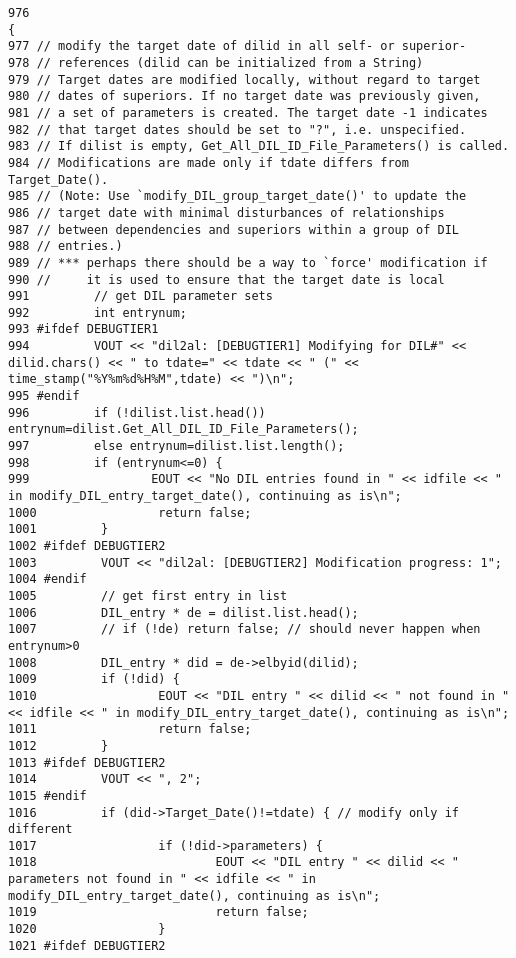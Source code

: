 \footnotesize\begin{verbatim}976                                                                                             {
977 // modify the target date of dilid in all self- or superior-
978 // references (dilid can be initialized from a String)
979 // Target dates are modified locally, without regard to target
980 // dates of superiors. If no target date was previously given,
981 // a set of parameters is created. The target date -1 indicates
982 // that target dates should be set to "?", i.e. unspecified.
983 // If dilist is empty, Get_All_DIL_ID_File_Parameters() is called.
984 // Modifications are made only if tdate differs from Target_Date().
985 // (Note: Use `modify_DIL_group_target_date()' to update the
986 // target date with minimal disturbances of relationships
987 // between dependencies and superiors within a group of DIL
988 // entries.)
989 // *** perhaps there should be a way to `force' modification if
990 //     it is used to ensure that the target date is local
991         // get DIL parameter sets
992         int entrynum;
993 #ifdef DEBUGTIER1
994         VOUT << "dil2al: [DEBUGTIER1] Modifying for DIL#" << dilid.chars() << " to tdate=" << tdate << " (" << time_stamp("%Y%m%d%H%M",tdate) << ")\n";
995 #endif
996         if (!dilist.list.head()) entrynum=dilist.Get_All_DIL_ID_File_Parameters();
997         else entrynum=dilist.list.length();
998         if (entrynum<=0) {
999                 EOUT << "No DIL entries found in " << idfile << " in modify_DIL_entry_target_date(), continuing as is\n";
1000                 return false;
1001         }
1002 #ifdef DEBUGTIER2
1003         VOUT << "dil2al: [DEBUGTIER2] Modification progress: 1";
1004 #endif
1005         // get first entry in list
1006         DIL_entry * de = dilist.list.head();
1007         // if (!de) return false; // should never happen when entrynum>0
1008         DIL_entry * did = de->elbyid(dilid);
1009         if (!did) {
1010                 EOUT << "DIL entry " << dilid << " not found in " << idfile << " in modify_DIL_entry_target_date(), continuing as is\n";
1011                 return false;
1012         }
1013 #ifdef DEBUGTIER2
1014         VOUT << ", 2";
1015 #endif
1016         if (did->Target_Date()!=tdate) { // modify only if different
1017                 if (!did->parameters) {
1018                         EOUT << "DIL entry " << dilid << " parameters not found in " << idfile << " in modify_DIL_entry_target_date(), continuing as is\n";
1019                         return false;
1020                 }
1021 #ifdef DEBUGTIER2

\end{verbatim}

